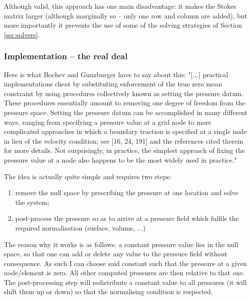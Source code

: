 Although valid, this approach has one main disadvantage: it makes the Stokes matrix larger (although
marginally so -- only one row and column are added), but more importantly it prevents the use of some
of the solving strategies of Section \ref{sec:solvers}.


\subsubsection{Implementation -- the real deal}

Here is what Bochev and Gunzburger \cite[Section 7.6.4]{bogu09} have to say about this:
"[...] practical implementations cheat by substituting enforcement of the true zero mean constraint by using
procedures collectively known as setting the pressure datum. These procedures essentially 
amount to removing one degree of freedom from the pressure space.
Setting the pressure datum can be accomplished in many different ways, ranging
from specifying a pressure value at a grid node to more complicated approaches in
which a boundary traction is specified at a single node in lieu of the velocity condition; 
see [16, 24, 191] and the references cited therein for more details. Not surprisingly, 
in practice, the simplest approach of fixing the pressure value at a node also
happens to be the most widely used in practice."




The idea is actually quite simple and requires two steps:
\begin{enumerate}
\item remove the null space by prescribing the pressure at one location and solve the system;
\item post-process the pressure so as to arrive at a pressure field which fulfils the required normalisation (surface, volume, ...)
\end{enumerate}

The reason why it works is as follows: a constant pressure value lies in the null space, so that one can 
add or delete any value to the pressure field without consequence. As such I can choose said constant such that 
the pressure at a given node/element is zero. All other computed pressures are then relative to that one. 
The post-processing step will redistribute a constant value to all pressures (it will shift them up or down)
so that the normalising condition is respected. 


\Literature

